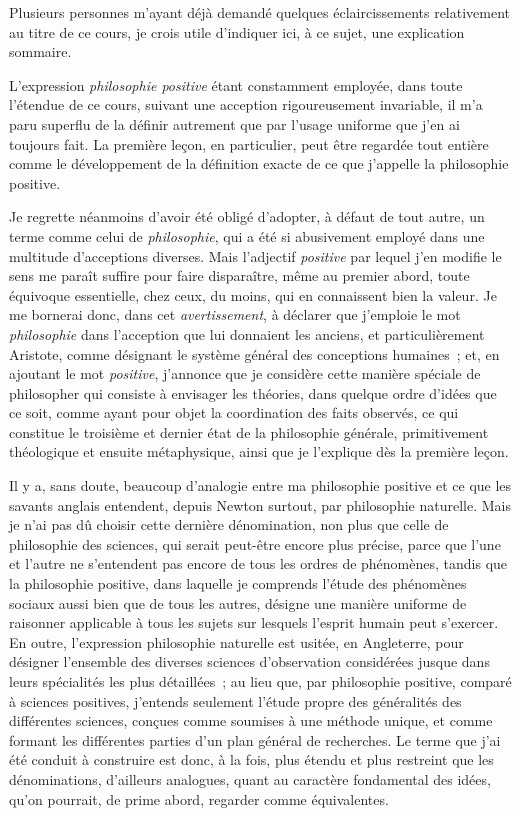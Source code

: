 \documentclass[french,twoside]{book} %
\begin{document}
Plusieurs personnes m’ayant déjà demandé quelques éclaircissements relativement au titre de ce cours, je crois utile d’indiquer ici, à ce sujet, une explication sommaire.\par
L’expression {\itshape philosophie positive} étant constamment employée, dans toute l’étendue de ce cours, suivant une acception rigoureusement invariable, il m’a paru superflu de la définir autrement que par l’usage uniforme que j’en ai toujours fait. La première leçon, en particulier, peut être regardée tout entière comme le développement de la définition exacte de ce que j’appelle la philosophie positive.\par
Je regrette néanmoins d’avoir été obligé d’adopter, à défaut de tout autre, un terme comme celui de {\itshape philosophie}, qui a été si abusivement employé dans une multitude d’acceptions diverses. Mais l’adjectif {\itshape positive} par lequel j’en modifie le sens me paraît suffire pour faire disparaître, même au premier abord, toute équivoque essentielle, chez ceux, du moins, qui en connaissent bien la valeur. Je me bornerai donc, dans cet {\itshape avertissement}, à déclarer que j’emploie le mot {\itshape philosophie} dans l’acception que lui donnaient les anciens, et particulièrement Aristote, comme désignant le système général des conceptions humaines ; et, en ajoutant le mot {\itshape positive}, j’annonce que je considère cette manière spéciale de philosopher qui consiste à envisager les théories, dans quelque ordre d’idées que ce soit, comme ayant pour objet la coordination des faits observés, ce qui constitue le troisième et dernier état de la philosophie générale, primitivement théologique et ensuite métaphysique, ainsi que je l’explique dès la première leçon.\par
Il y a, sans doute, beaucoup d’analogie entre ma philosophie positive et ce que les savants anglais entendent, depuis Newton surtout, par philosophie naturelle. Mais je n’ai pas dû choisir cette dernière dénomination, non plus que celle de philosophie des sciences, qui serait peut-être encore plus précise, parce que l’une et l’autre ne s’entendent pas encore de tous les ordres de phénomènes, tandis que la philosophie positive, dans laquelle je comprends l’étude des phénomènes sociaux aussi bien que de tous les autres, désigne une manière uniforme de raisonner applicable à tous les sujets sur lesquels l’esprit humain peut s’exercer. En outre, l’expression philosophie naturelle est usitée, en Angleterre, pour désigner l’ensemble des diverses sciences d’observation considérées jusque dans leurs spécialités les plus détaillées ; au lieu que, par philosophie positive, comparé à sciences positives, j’entends seulement l’étude propre des généralités des différentes sciences, conçues comme soumises à une méthode unique, et comme formant les différentes parties d’un plan général de recherches. Le terme que j’ai été conduit à construire est donc, à la fois, plus étendu et plus restreint que les dénominations, d’ailleurs analogues, quant au caractère fondamental des idées, qu’on pourrait, de prime abord, regarder comme équivalentes.\par
\end{document}
